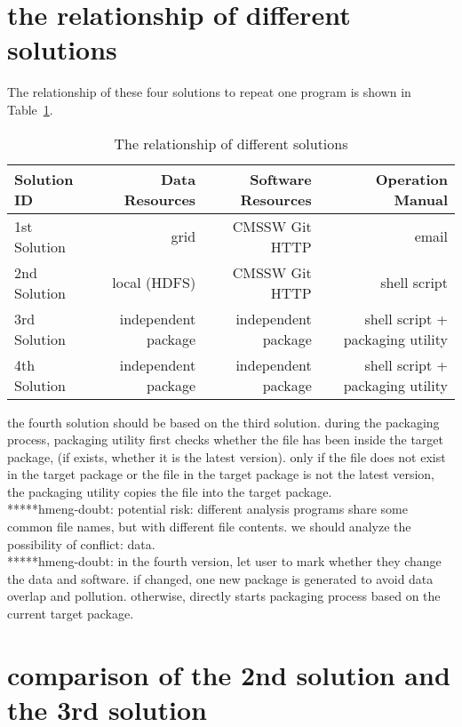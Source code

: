 \documentclass{article}
\begin{document}
\section{the relationship of different solutions}
\indent The relationship of these four solutions to repeat one program is shown in Table~\ref{table:relationship}.\\

\begin{table}
    \centering
    \begin{tabular}{|l|r|r|r|}
        \hline
        Solution ID & Data Resources & Software Resources & Operation Manual \\ \hline
        1st Solution & grid & CMSSW Git HTTP & email \\ \hline
        2nd Solution & local (HDFS) & CMSSW Git HTTP & shell script \\ \hline
        3rd Solution & independent package & independent package & shell script + packaging utility \\ \hline
        4th Solution & independent package & independent package & shell script + packaging utility \\ \hline
    \end{tabular}
    \caption{The relationship of different solutions}
    \label{table:relationship}
\end{table}

the fourth solution should be based on the third solution. during the packaging process, packaging utility first checks whether the file has been inside the target package, (if exists, whether it is the latest version). only if the file does not exist in the target package or the file in the target package is not the latest version, the packaging utility copies the file into the target package.\\

*****hmeng-doubt: potential risk: different analysis programs share some common file names, but with different file contents. we should analyze the possibility of conflict: data.\\

*****hmeng-doubt: in the fourth version, let user to mark whether they change the data and software. if changed, one new package is generated to avoid data overlap and pollution. otherwise, directly starts packaging process based on the current target package. \\

\section{comparison of the 2nd solution and the 3rd solution}
\end{document}
